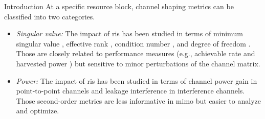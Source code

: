 \documentclass[journal]{IEEEtran}
\begin{document}
\begin{section}{Introduction}
		At a specific resource block, channel shaping metrics can be classified into two categories.
		\begin{itemize}
			\item \emph{Singular value:} The impact of \gls{ris} has been studied in terms of minimum singular value \cite{ElMossallamy2021}, effective rank \cite{ElMossallamy2021,Meng2023}, condition number \cite{Zheng2022,Huang2023}, and degree of freedom \cite{Bafghi2022,Zheng2023,Chae2023}. Those are closely related to performance measures (e.g., achievable rate and harvested power \cite{Shen2021}) but sensitive to minor perturbations of the channel matrix.
			\item \emph{Power:} The impact of \gls{ris} has been studied in terms of channel power gain \cite{Wu2019,Shen2020a,Nerini2023,Nerini2024,Santamaria2023} in point-to-point channels and leakage interference \cite{Santamaria2023a} in interference channels. Those second-order metrics are less informative in \gls{mimo} but easier to analyze and optimize.
		\end{itemize}


\end{section}
\end{document}
